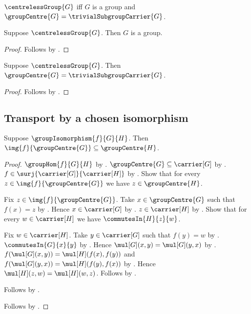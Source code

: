 \begin{definition}\label{centreless_group}
    $\centrelessGroup{G}$ iff
        $G$ is a group and
        $\groupCentre{G}=\trivialSubgroupCarrier{G}$.
\end{definition}

\begin{proposition}\label{centreless_group_is_group}
    Suppose $\centrelessGroup{G}$.
    Then $G$ is a group.
\end{proposition}
\begin{proof}
    Follows by .
\end{proof}

\begin{proposition}\label{centreless_group_centre}
    Suppose $\centrelessGroup{G}$.
    Then $\groupCentre{G}=\trivialSubgroupCarrier{G}$.
\end{proposition}
\begin{proof}
    Follows by .
\end{proof}

\subsection{Transport by a chosen isomorphism}

\begin{theorem}\label{group_isomorphism_centre_image_subseteq}
    Suppose $\groupIsomorphism{f}{G}{H}$.
    Then $\img{f}{\groupCentre{G}}\subseteq\groupCentre{H}$.
\end{theorem}
\begin{proof}
    $\groupHom{f}{G}{H}$ by
        .
    $\groupCentre{G}\subseteq\carrier[G]$ by
        .
    $f\in\surj{\carrier[G]}{\carrier[H]}$ by
        .
    Show that for every $z\in\img{f}{\groupCentre{G}}$ we have
        $z\in\groupCentre{H}$.
    \begin{subproof}
        Fix $z\in\img{f}{\groupCentre{G}}$.
        Take $x\in\groupCentre{G}$ such that $f(x)=z$ by
            .
        Hence $x\in\carrier[G]$ by
            .
        $z\in\carrier[H]$ by
            .
        Show that for every $w\in\carrier[H]$ we have
            $\commutesIn{H}{z}{w}$.
        \begin{subproof}
            Fix $w\in\carrier[H]$.
            Take $y\in\carrier[G]$ such that $f(y)=w$ by
                .
            $\commutesIn{G}{x}{y}$ by
                .
            Hence $\mul[G](x,y)=\mul[G](y,x)$ by
                .
            $f(\mul[G](x,y))=\mul[H](f(x),f(y))$ and
                $f(\mul[G](y,x))=\mul[H](f(y),f(x))$ by
                .
            Hence $\mul[H](z,w)=\mul[H](w,z)$.
            Follows by .
        \end{subproof}
        Follows by .
    \end{subproof}
    Follows by .
\end{proof}

